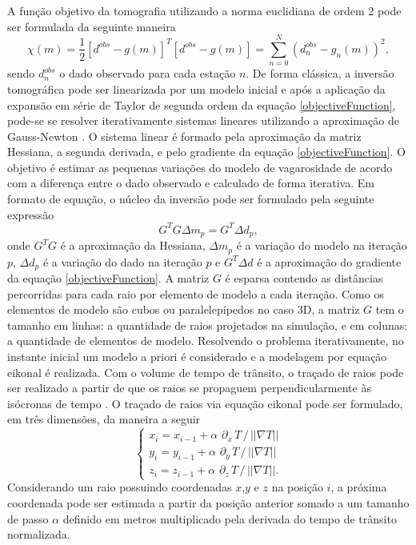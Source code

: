 A função objetivo da tomografia utilizando a norma euclidiana de ordem 2 pode ser formulada da seguinte maneira
\begin{equation}
	\chi(m) = \dfrac{1}{2}\left[d^{obs} - g(m)\right]^T\left[d^{obs} - g(m)\right] = \displaystyle\sum_{n = 0}^N(d^{obs}_n - g_n(m))^2, 
	\label{objectiveFunction}
\end{equation} 
\noindent sendo $d^{obs}_n$ o dado observado para cada estação $n$. De forma clássica, a inversão tomográfica pode ser linearizada por um modelo inicial e após a aplicação da expansão em série de Taylor de segunda ordem da equação \ref{objectiveFunction}, pode-se se resolver iterativamente sistemas lineares utilizando a aproximação de Gauss-Newton \cite{tarantola2005inverse, menke2018geophysical, aster2018parameter}. O sistema linear é formado pela aproximação da matriz Hessiana, a segunda derivada, e pelo gradiente da equação \ref{objectiveFunction}. O objetivo é estimar as pequenas variações do modelo de vagarosidade de acordo com a diferença entre o dado observado e calculado de forma iterativa. Em formato de equação, o núcleo da inversão pode ser formulado pela seguinte expressão 
\begin{equation}
	G^TG \Delta m_p = G^T\Delta d_p, 		
	\label{linearSystem}
\end{equation} 
\noindent onde $G^TG$ é a aproximação da Hessiana, $\Delta m_p$ é a variação do modelo na iteração $p$, $\Delta d_p$ é a variação do dado na iteração $p$ e $G^T\Delta d$ é a aproximação do gradiente da equação \ref{objectiveFunction}. A matriz $G$ é esparsa contendo as distâncias percorridas para cada raio por elemento de modelo a cada iteração. Como os elementos de modelo são cubos ou paralelepípedos no caso 3D, a matriz $G$ tem o tamanho em linhas: a quantidade de raios projetados na simulação, e em colunas: a quantidade de elementos de modelo. Resolvendo o problema iterativamente, no instante inicial um modelo a priori é considerado e a modelagem por equação eikonal é realizada. Com o volume de tempo de trânsito, o traçado de raios pode ser realizado a partir de que os raios se propaguem perpendicularmente às isócronas de tempo \cite{vidale1988finite}. O traçado de raios via equação eikonal pode ser formulado, em três dimensões, da maneira a seguir
\begin{equation}
	\begin{cases}
		x_i = x_{i-1} + \alpha\,\, \partial_x\, T \,/\, ||\nabla T|| \\ 
		y_i = y_{i-1} + \alpha\,\, \partial_y\, T \,/\, ||\nabla T|| \\ 
		z_i = z_{i-1} + \alpha\,\, \partial_z\, T \,/\, ||\nabla T||. 
	\end{cases}
	\label{rayTracing}
\end{equation}
\noindent Considerando um raio possuindo coordenadas $x$,$y$ e $z$ na posição $i$, a próxima coordenada pode ser estimada a partir da posição anterior somado a um tamanho de passo $\alpha$ definido em metros multiplicado pela derivada do tempo de trânsito normalizada.  


